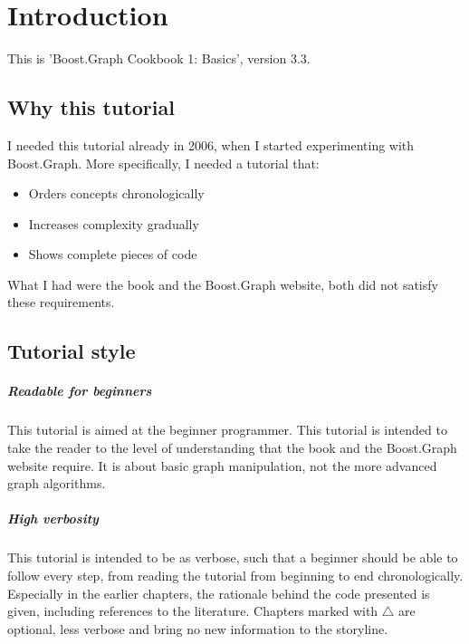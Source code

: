 \chapter{Introduction}

This is 'Boost.Graph Cookbook 1: Basics', version 3.3.

\section{Why this tutorial}

I needed this tutorial already in 2006, when I started experimenting with
Boost.Graph. More specifically, I needed a tutorial that:

\begin{itemize}
  \item Orders concepts chronologically
  \item Increases complexity gradually
  \item Shows complete pieces of code
\end{itemize}

What I had were the book \cite{siek2001boost}
and the Boost.Graph website, both did not satisfy these requirements.

\section{Tutorial style}

\paragraph{Readable for beginners}

This tutorial is aimed at the beginner programmer.
This tutorial is intended to take the reader to the level of understanding
that the book \cite{siek2001boost}
and the Boost.Graph website require.
It is about basic graph manipulation, not the more advanced graph algorithms.
 
\paragraph{High verbosity}

This tutorial is intended to be as verbose, 
such that a beginner should
be able to follow every step, 
from reading the tutorial from beginning
to end chronologically.
Especially in the earlier chapters, the rationale behind the code presented
is given, including references to the literature.
Chapters marked with $\triangle$ are optional, 
less verbose and bring no new information to the storyline.

